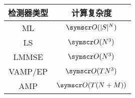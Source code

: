 \documentclass[type=master]{../gdutthesis}
\newcommand{\mscr}{\symscr}
\begin{document}
\begin{table}[htbp]
  \label{Comparison_diagram_of_computational_complexity_of_detector}
  \begin{tabular}{cc}
    \toprule
    检测器类型 & 计算复杂度 \\
    \midrule
    ML        & $\mscr O(|S|^N)$ \\
    LS        & $\mscr O(N^3)$   \\
    LMMSE     & $\mscr O(N^3)$   \\
    VAMP/EP   & $\mscr O(TN^3)$   \\
    AMP       & $\mscr O(T(N+M))$   \\
    \bottomrule
    \end{tabular}
\end{table}
\end{document}
